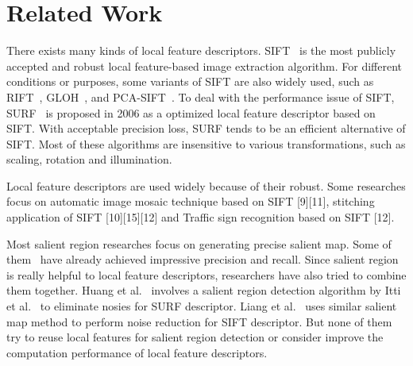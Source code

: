 \section{Related Work}

There exists many kinds of local feature descriptors. SIFT~\cite{lowe1999object}\cite{lowe2004distinctive} is the most publicly accepted and robust local feature-based image extraction algorithm. For different conditions or purposes, some variants of SIFT are also widely used, such as RIFT~\cite{lazebnik2005sparse}, GLOH~\cite{mikolajczyk2005performance}, and PCA-SIFT~\cite{ke2004pca}. To deal with the performance issue of SIFT, SURF~\cite{Bay2006SURF} is proposed in 2006 as a optimized local feature descriptor based on SIFT. With acceptable precision loss, SURF tends to be an efficient alternative of SIFT. Most of these algorithms are insensitive to various transformations, such as scaling, rotation and illumination.

Local feature descriptors are used widely because of their robust. Some researches focus on automatic image mosaic technique based on SIFT [9][11], stitching application of SIFT [10][15][12] and Traffic sign recognition based on SIFT [12].

Most salient region researches focus on generating precise salient map. Some of them~\cite{cheng2011global,achanta2009frequency} have already achieved impressive precision and recall. Since salient region is really helpful to local feature descriptors, researchers have also tried to combine them together. Huang et al.~\cite{huang2009image} involves a salient region detection algorithm by Itti et al.~\cite{itti1998model} to eliminate nosies for SURF descriptor. Liang et al.~\cite{liang2010salient} uses similar salient map method to perform noise reduction for SIFT descriptor. But none of them try to reuse local features for salient region detection or consider improve the computation performance of local feature descriptors.